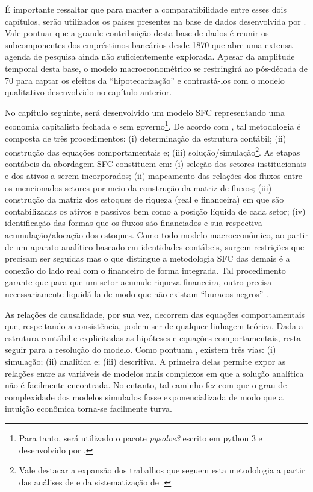 É importante ressaltar que para manter a comparatibilidade entre esses dois capítulos, serão utilizados os países presentes na base de dados desenvolvida por \textcite{jorda_great_2014}. Vale pontuar que a grande contribuição desta base de dados é reunir os subcomponentes dos empréstimos bancários desde 1870 que abre uma extensa agenda de pesquisa ainda não suficientemente explorada.
Apesar da amplitude temporal desta base, o modelo macroeconométrico se restringirá ao pós-década de 70 para captar os efeitos da ``hipotecarização'' e contrastá-los com o modelo qualitativo desenvolvido no capítulo anterior.

No capítulo seguinte, será desenvolvido um modelo SFC representando uma economia capitalista fechada e sem governo\footnote{Para tanto, será utilizado o pacote \textit{pysolve3} escrito em python 3 e desenvolvido por \textcite{petrini_pysolve3_2019}.}. 
De acordo com \textcite{macedo_e_silva_peering_2011}, tal metodologia é composta de
três procedimentos: (i) determinação da estrutura contábil; (ii) construção das equações comportamentais
e; (iii) solução/simulação\footnote{
	Vale destacar a expansão dos trabalhos que seguem esta metodologia a partir das análises de \textcite{godley_money_1999} e da sistematização de \textcite{godley_monetary_2007}.
}.
As etapas contábeis da abordagem SFC constituem em: (i) seleção dos setores institucionais e dos ativos a serem incorporados; (ii) mapeamento das relações dos fluxos entre os mencionados setores por meio da construção da matriz de fluxos; (iii) construção da matriz dos estoques de riqueza (real e financeira) em que são contabilizadas os ativos e passivos  bem como a posição líquida de cada setor; (iv) identificação das formas que os fluxos são financiados e sua respectiva acumulação/alocação dos estoques. 
Como todo modelo macroeconômico, ao partir de um aparato analítico
baseado em identidades contábeis, surgem restrições que precisam ser seguidas mas o que distingue a metodologia SFC das demais é a conexão do lado real com o financeiro de forma integrada.
Tal procedimento garante que para que um setor acumule riqueza financeira, outro precisa necessariamente liquidá-la de modo que não existam ``buracos negros'' \cite{godley_money_1996}.

As relações de causalidade, por sua vez, decorrem das equações comportamentais que, respeitando a consistência, podem ser de qualquer linhagem teórica.
Dada a estrutura contábil e explicitadas as hipóteses e equações comportamentais, resta seguir para a resolução do modelo. Como pontuam \textcite{caverzasi_stock-flow_2013}, existem três vias: (i) simulação; (ii) analítica e; (iii) descritiva. A primeira delas permite expor as relações entre as variáveis de modelos mais complexos em que a solução analítica não é facilmente encontrada. No entanto, tal caminho fez com que o grau de complexidade dos modelos simulados fosse exponencializada de modo que a intuição econômica torna-se facilmente turva.  


